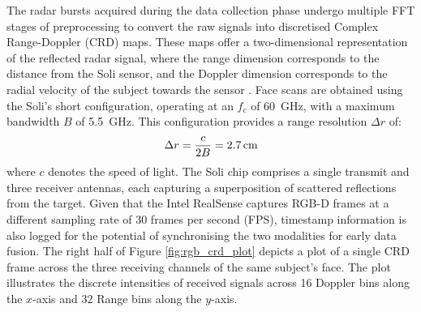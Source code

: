 \documentclass{mpaper}
\begin{document}
The radar bursts acquired during the data collection phase undergo multiple FFT stages of preprocessing to convert the raw signals into discretised Complex Range-Doppler (CRD) maps. These maps offer a two-dimensional representation of the reflected radar signal, where the range dimension corresponds to the distance from the Soli sensor, and the Doppler dimension corresponds to the radial velocity of the subject towards the sensor \cite{lien2016soli,hayashi2021radarnet}. Face scans are obtained using the Soli's short configuration, operating at an $f_c$ of \qty{60}{\GHz}, with a maximum bandwidth $B$ of \qty{5.5}{\GHz}. This configuration provides a range resolution $\Delta r$ of:
$$\Delta r = \frac{c}{2B} = \text{\qty{2.7}{\cm}}$$
where $c$ denotes the speed of light. The Soli chip comprises a single transmit and three receiver antennas, each capturing a superposition of scattered reflections from the target. Given that the Intel RealSense captures RGB-D frames at a different sampling rate of 30 frames per second (FPS), timestamp information is also logged for the potential of synchronising the two modalities for early data fusion. The right half of Figure \ref{fig:rgb_crd_plot} depicts a plot of a single CRD frame across the three receiving channels of the same subject's face. The plot illustrates the discrete intensities of received signals across 16 Doppler bins along the $x$-axis and 32 Range bins along the $y$-axis.
\end{document}
